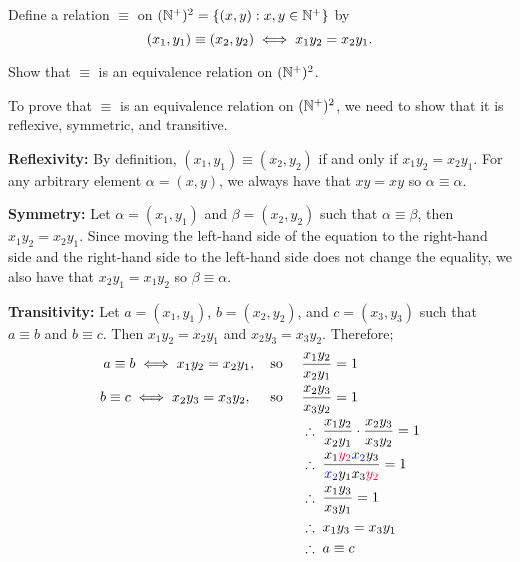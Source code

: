 \begin{problem}
  Define a relation $\equiv$ on $(\mathbb{N}^+)^2 = \left\{(x, y) : x, y \in \mathbb{N}^+\right\}$ by
  \[ (x_1, y_1) \equiv (x_2, y_2) \;\Longleftrightarrow\; x_1y_2 = x_2y_1. \]
  \begin{enumalph}
    \item Show that $\equiv$ is an equivalence relation on $(\mathbb{N}^+)^2$.
      \begin{Answer}
        To prove that $\equiv$ is an equivalence relation on $(\mathbb{N}^+)^2$,
        we need to show that it is reflexive, symmetric, and transitive.
        \begin{enumroman}
          \item \textbf{Reflexivity:}
            By definition, $(x_1, y_1) \equiv (x_2, y_2)$ if and only if $x_1 y_2 = x_2y_1$.
            For any arbitrary element $\alpha = (x, y)$, we always have that $x y = x y$
            so $\alpha \equiv \alpha$.
          \item \textbf{Symmetry:}
            Let $\alpha = (x_1, y_1)$ and $\beta = (x_2, y_2)$
            such that $\alpha \equiv \beta$, then $x_1 y_2 = x_2 y_1$.
            Since moving the left-hand side of the equation to the right-hand side
            and the right-hand side to the left-hand side does not change the equality,
            we also have that $x_2 y_1 = x_1 y_2$ so $\beta \equiv \alpha$.
          \item \textbf{Transitivity:}
            Let $a = (x_1, y_1)$, $b = (x_2, y_2)$, and $c = (x_3, y_3)$
            such that $a \equiv b$ and $b \equiv c$.
            Then $x_1 y_2 = x_2 y_1$ and $x_2 y_3 = x_3 y_2$.
            Therefore;
            \begin{align*}
              a \equiv b \Iff x_1 y_2 = x_2 y_1, \quad \text{so } \quad &\frac{x_1 y_2}{x_2 y_1} = 1 \\
              b \equiv c \Iff x_2 y_3 = x_3 y_2, \quad \text{ so } \quad &\frac{x_2 y_3}{x_3 y_2} = 1 \\
              &\Therefore \frac{x_1 y_2}{x_2 y_1} \cdot \frac{x_2 y_3}{x_3 y_2} = 1 \\
              &\Therefore \frac{x_1 \crim{y_2} \zaff{x_2} y_3}{\zaff{x_2} y_1 x_3 \crim{y_2}} = 1\\
              &\Therefore \frac{x_1 y_3}{x_3 y_1} = 1 \\
              &\Therefore x_1 y_3 = x_3 y_1 \\
              &\Therefore a \equiv c
            \end{align*}
        \end{enumroman}

\end{Answer}
\end{enumalph}
\end{problem}
